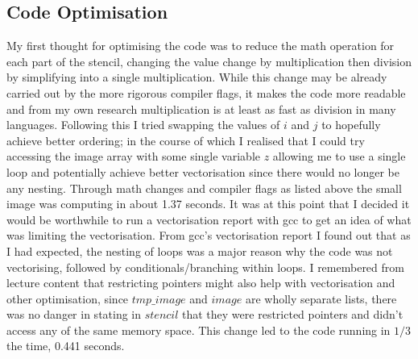 \documentclass{article}
\begin{document}
\begin{center}
    \subsection{Code Optimisation}
    My first thought for optimising the code was to reduce the math operation for each part of the stencil, changing the value change by multiplication 
    then division by simplifying into a single multiplication. While this change may be already carried out by the more rigorous compiler flags, it makes
    the code more readable and from my own research multiplication is at least as fast as division in many languages.
    Following this I tried swapping the values of $i$ and $j$ to hopefully achieve better ordering; in the course of which I realised that I could try
    accessing the image array with some single variable $z$ allowing me to use a single loop and potentially achieve better vectorisation since there would
    no longer be any nesting.
    Through math changes and compiler flags as listed above the small image was computing in about 1.37 seconds. It was at this point that I decided it would
    be worthwhile to run a vectorisation report with gcc to get an idea of what was limiting the vectorisation. \n
    From gcc's vectorisation report I found out that as I had expected, the nesting of loops was a major reason why the code was not vectorising, followed
    by conditionals/branching within loops. I remembered from lecture content that restricting pointers might also help with vectorisation and other optimisation,
    since $tmp\_image$ and $image$ are wholly separate lists, there was no danger in stating in $stencil$ that they were restricted pointers and didn't access any
    of the same memory space. This change led to the code running in $1/3$ the time, 0.441 seconds.

\end{center}
\end{document}
